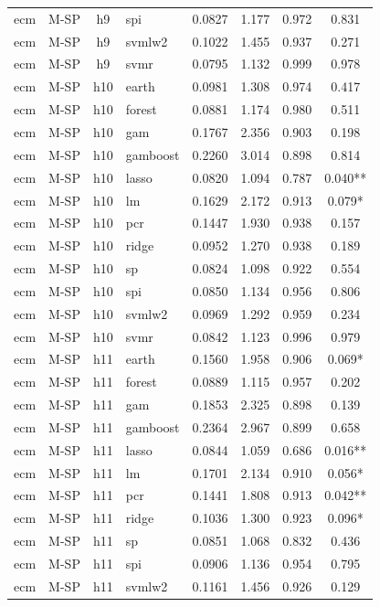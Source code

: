 \begin{ThreePartTable}
\begin{longtable}[t]{llclcccc}
ecm & M-SP & h9 & spi & 0.0827 & 1.177 & 0.972 & 0.831\\
ecm & M-SP & h9 & svmlw2 & 0.1022 & 1.455 & 0.937 & 0.271\\
ecm & M-SP & h9 & svmr & 0.0795 & 1.132 & 0.999 & 0.978\\
\addlinespace
ecm & M-SP & h10 & earth & 0.0981 & 1.308 & 0.974 & 0.417\\
ecm & M-SP & h10 & forest & 0.0881 & 1.174 & 0.980 & 0.511\\
ecm & M-SP & h10 & gam & 0.1767 & 2.356 & 0.903 & 0.198\\
ecm & M-SP & h10 & gamboost & 0.2260 & 3.014 & 0.898 & 0.814\\
ecm & M-SP & h10 & lasso & 0.0820 & 1.094 & 0.787 & 0.040**\\
ecm & M-SP & h10 & lm & 0.1629 & 2.172 & 0.913 & 0.079*\\
ecm & M-SP & h10 & pcr & 0.1447 & 1.930 & 0.938 & 0.157\\
ecm & M-SP & h10 & ridge & 0.0952 & 1.270 & 0.938 & 0.189\\
ecm & M-SP & h10 & sp & 0.0824 & 1.098 & 0.922 & 0.554\\
ecm & M-SP & h10 & spi & 0.0850 & 1.134 & 0.956 & 0.806\\
ecm & M-SP & h10 & svmlw2 & 0.0969 & 1.292 & 0.959 & 0.234\\
ecm & M-SP & h10 & svmr & 0.0842 & 1.123 & 0.996 & 0.979\\
\addlinespace
ecm & M-SP & h11 & earth & 0.1560 & 1.958 & 0.906 & 0.069*\\
ecm & M-SP & h11 & forest & 0.0889 & 1.115 & 0.957 & 0.202\\
ecm & M-SP & h11 & gam & 0.1853 & 2.325 & 0.898 & 0.139\\
ecm & M-SP & h11 & gamboost & 0.2364 & 2.967 & 0.899 & 0.658\\
ecm & M-SP & h11 & lasso & 0.0844 & 1.059 & 0.686 & 0.016**\\
ecm & M-SP & h11 & lm & 0.1701 & 2.134 & 0.910 & 0.056*\\
ecm & M-SP & h11 & pcr & 0.1441 & 1.808 & 0.913 & 0.042**\\
ecm & M-SP & h11 & ridge & 0.1036 & 1.300 & 0.923 & 0.096*\\
ecm & M-SP & h11 & sp & 0.0851 & 1.068 & 0.832 & 0.436\\
ecm & M-SP & h11 & spi & 0.0906 & 1.136 & 0.954 & 0.795\\
ecm & M-SP & h11 & svmlw2 & 0.1161 & 1.456 & 0.926 & 0.129\\

\end{longtable}
\end{ThreePartTable}

